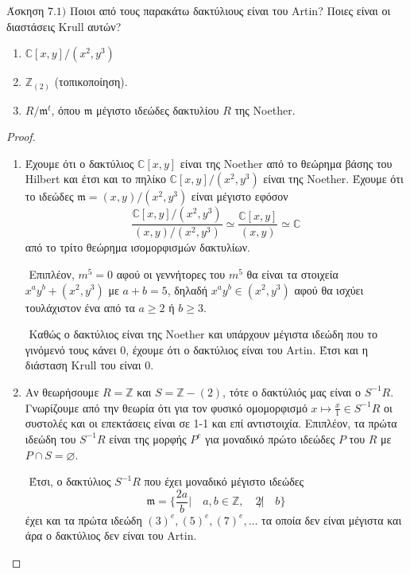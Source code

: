 \documentclass[oneside,a4paper]{article}
\newcommand {\tl}{\textlatin}
\newcommand{\Z}{\mathbb{Z}}
\begin{document}
\noindent Άσκηση $7.1)$
\quad Ποιοι από τους παρακάτω δακτύλιους είναι του \tl{Artin}? Ποιες είναι οι διαστάσεις \tl{Krull} αυτών?
\begin{enumerate}
	\item $\mathbb{C}[x,y]/(x^2,y^3)$
	\item $\Z_{(2)}$ (τοπικοποίηση).
	\item $R/\mathfrak{m}^t$, όπου $\mathfrak{m}$ μέγιστο ιδεώδες δακτυλίου $R$ της \tl{Noether}.
\end{enumerate}
\vspace*{1cm}
\begin{proof}
	
	$ $\newline
	\begin{enumerate}

		

		\item Έχουμε ότι ο δακτύλιος $\mathbb{C}[x,y]$ είναι της \tl{Noether} από το θεώρημα βάσης του \tl{Hilbert} και έτσι και το πηλίκο $\mathbb{C}[x,y]/(x^2,y^3)$ είναι της \tl{Noether}. Έχουμε ότι το ιδεώδες $\mathfrak{m} = (x,y)/(x^2,y^3)$ είναι μέγιστο εφόσον $$\frac{\mathbb{C}[x,y]/(x^2,y^3)}{(x,y)/(x^2,y^3)} \simeq \frac{\mathbb{C}[x,y]}{(x,y)} \simeq \mathbb{C}$$
		από το τρίτο θεώρημα ισομορφισμών δακτυλίων.

		$ $\newline
		Επιπλέον, $m^5 = 0$ αφού οι γεννήτορες του $m^5$ θα είναι τα στοιχεία $x^ay^b + (x^2,y^3)$ με $a+b = 5$, δηλαδή $x^ay^b \in (x^2,y^3)$ αφού θα ισχύει τουλάχιστον ένα από τα $a\geq 2$ ή $b \geq 3$.

		$ $\newline
		Καθώς ο δακτύλιος είναι της \tl{Noether} και υπάρχουν μέγιστα ιδεώδη που το γινόμενό τους κάνει $0$, έχουμε ότι ο δακτύλιος είναι του \tl{Artin}. Έτσι και η διάσταση \tl{Krull} του είναι $0$.

		\vspace*{0.5cm}
		\item Αν θεωρήσουμε $R = \mathbb{Z}$ και $S = \mathbb{Z}-(2)$, τότε ο δακτύλιός μας είναι ο $S^{-1} R$. Γνωρίζουμε από την θεωρία ότι για τον φυσικό ομομορφισμό $ x \mapsto \frac{x}1 \in S^{-1} R$ οι συστολές και οι επεκτάσεις είναι σε 1-1 και επί αντιστοιχία. Επιπλέον, τα πρώτα ιδεώδη του $S^{-1}R$ είναι της μορφής $P^e$ για μοναδικό πρώτο ιδεώδες $P$ του $R$ με $P\cap S = \varnothing$.
		
		$ $\newline
		Έτσι, ο δακτύλιος $S^{-1}R$ που έχει μοναδικό μέγιστο ιδεώδες
		$$ \mathfrak{m} = \big\{\frac{2a}{b}| \quad a,b \in \Z, \quad 2\not | \quad b\}$$ έχει και τα πρώτα ιδεώδη $(3)^e, (5)^e, (7)^e, \ldots$ τα οποία δεν είναι μέγιστα και άρα ο δακτύλιος δεν είναι του \tl{Artin}. 
		

\end{enumerate}
\end{proof}
\end{document}
